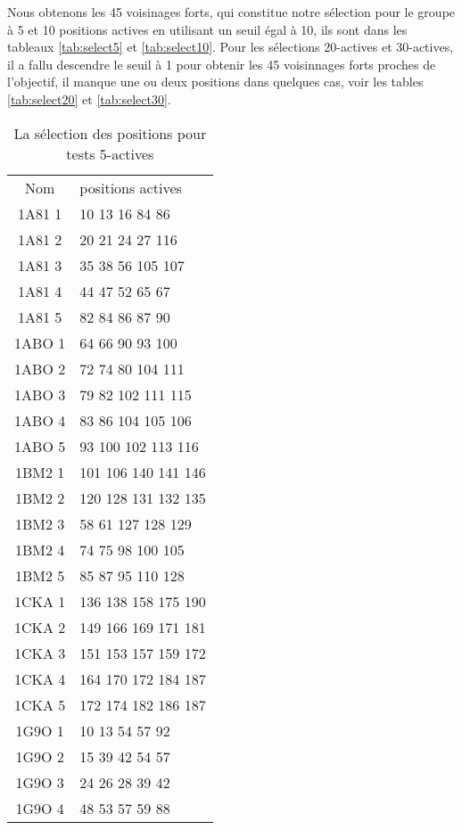 Nous obtenons les 45 voisinages forts, qui constitue notre sélection pour le groupe à 5 et 10 positions actives en utilisant un seuil égal à 10, ils sont dans les tableaux \ref{tab:select5} et \ref{tab:select10}. Pour les sélections 20-actives et 30-actives, il a fallu descendre le seuil à 1 pour obtenir les 45 voisinnages forts proches de l'objectif, il manque une ou deux positions dans quelques cas, voir les tables \ref{tab:select20} et \ref{tab:select30}.

\begin{table}[!htbp]
  \centering
  \caption{ La sélection des positions pour tests 5-actives }
    \begin{tabular}{cl}      
      \toprule
      Nom & positions actives \\
      \cmidrule{1-2}
      1A81 1 & 10 13 16 84 86 \\
      1A81 2 & 20 21 24 27 116 \\
      1A81 3 & 35 38 56 105 107 \\
      1A81 4 & 44 47 52 65 67 \\
      1A81 5 & 82 84 86 87 90 \\
      1ABO 1 & 64 66 90 93 100 \\
      1ABO 2 & 72 74 80 104 111 \\
      1ABO 3 & 79 82 102 111 115 \\
      1ABO 4 & 83 86 104 105 106 \\
      1ABO 5 & 93 100 102 113 116 \\
      1BM2 1 & 101 106 140 141 146 \\
      1BM2 2 & 120 128 131 132 135 \\
      1BM2 3 & 58 61 127 128 129 \\
      1BM2 4 & 74 75 98 100 105 \\
      1BM2 5 & 85 87 95 110 128 \\
      1CKA 1 & 136 138 158 175 190 \\
      1CKA 2 & 149 166 169 171 181 \\
      1CKA 3 & 151 153 157 159 172 \\
      1CKA 4 & 164 170 172 184 187 \\
      1CKA 5 & 172 174 182 186 187 \\
      1G9O 1 & 10 13 54 57 92 \\
      1G9O 2 & 15 39 42 54 57 \\
      1G9O 3 & 24 26 28 39 42 \\
      1G9O 4 & 48 53 57 59 88 \\

\end{tabular}
\end{table}
